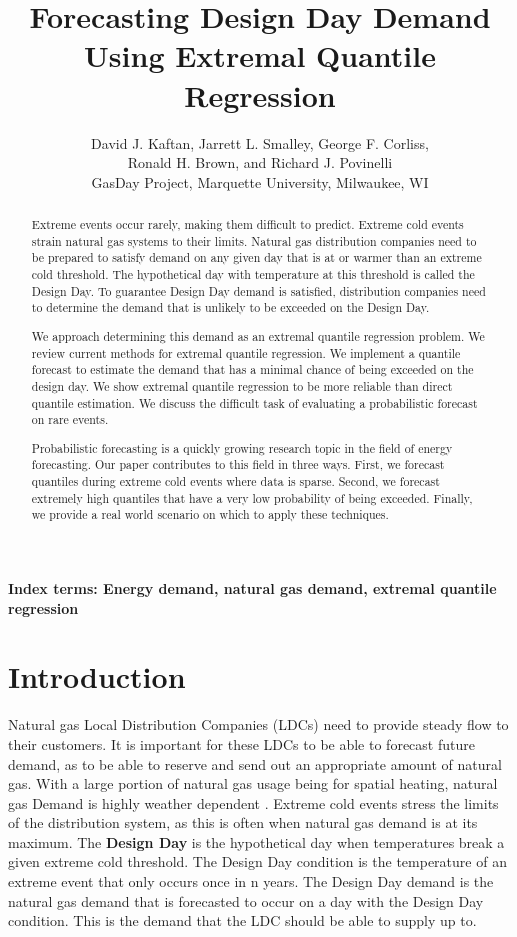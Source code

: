 \documentclass{article}
\title{Forecasting Design Day Demand Using Extremal Quantile Regression}
\author{David J. Kaftan, Jarrett L. Smalley, George F. Corliss, \\
Ronald H. Brown, and Richard J. Povinelli \\
GasDay Project, Marquette University, Milwaukee, WI
}
\date{}
\begin{document}
\maketitle

\begin{abstract}
Extreme events occur rarely, making them difficult to predict. Extreme cold events strain natural gas systems to their limits. Natural gas distribution companies need to be prepared to satisfy demand on any given day that is at or warmer than an extreme cold threshold. The hypothetical day with temperature at this threshold is called the Design Day. To guarantee Design Day demand is satisfied, distribution companies need to determine the demand that is unlikely to be exceeded on the Design Day.

We approach determining this demand as an extremal quantile regression problem. We review current methods for extremal quantile regression. We implement a quantile forecast to estimate the demand that has a minimal chance of being exceeded on the design day. We show extremal quantile regression to be more reliable than direct quantile estimation. We discuss the difficult task of evaluating a probabilistic forecast on rare events.

Probabilistic forecasting is a quickly growing research topic in the field of energy forecasting. Our paper contributes to this field in three ways. First, we forecast quantiles during extreme cold events where data is sparse. Second, we forecast extremely high quantiles that have a very low probability of being exceeded. Finally, we provide a real world scenario on which to apply these techniques.    
\end{abstract} 

{\bf Index terms: Energy demand, natural gas demand, extremal quantile regression}

\section{Introduction}
Natural gas Local Distribution Companies (LDCs) need to provide steady flow to their customers. It is important for these LDCs to be able to forecast future demand, as to be able to reserve and send out an appropriate amount of natural gas. With a large portion of natural gas usage being for spatial heating, natural gas Demand is highly weather dependent \cite{vitullo2009mathematical}. Extreme cold events stress the limits of the distribution system, as this is often when natural gas demand is at its maximum. The \textbf{Design Day} is the hypothetical day when temperatures break a given extreme cold threshold. The Design Day condition is the temperature of an extreme event that only occurs once in n years. The Design Day demand is the natural gas demand that is forecasted to occur on a day with the Design Day condition. This is the demand that the LDC should be able to supply up to. 
\end{document}

